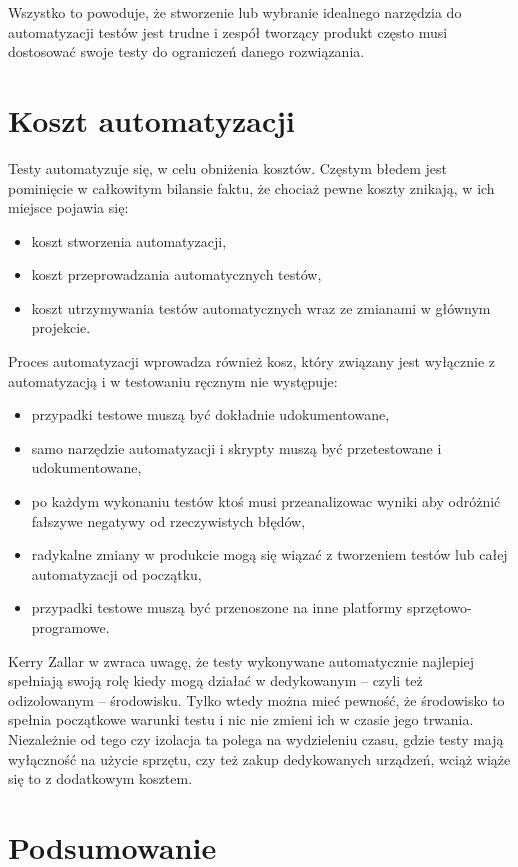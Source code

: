\documentclass[00-praca-magisterska.tex]{subfiles}
\begin{document}
Wszystko to powoduje, że stworzenie lub wybranie idealnego narzędzia do
automatyzacji testów jest trudne i zespół tworzący produkt często musi
dostosować swoje testy do ograniczeń danego rozwiązania.

\section{Koszt automatyzacji}

Testy automatyzuje się, w celu obniżenia kosztów. Częstym błedem jest
pominięcie w całkowitym bilansie faktu, że chociaż pewne koszty znikają, w ich
miejsce pojawia się:
\begin{itemize}
\item koszt stworzenia automatyzacji,
\item koszt przeprowadzania automatycznych testów,
\item koszt utrzymywania testów automatycznych wraz ze zmianami w głównym
projekcie.
\end{itemize}

Proces automatyzacji wprowadza również kosz, który związany jest wyłącznie z
automatyzacją i w testowaniu ręcznym nie występuje:
\begin{itemize}
\item przypadki testowe muszą być dokładnie udokumentowane,
\item samo narzędzie automatyzacji i skrypty muszą być przetestowane i udokumentowane,
\item po każdym wykonaniu testów ktoś musi przeanalizowac wyniki aby odróżnić
fałszywe negatywy od rzeczywistych błędów,
\item radykalne zmiany w produkcie mogą się wiązać z tworzeniem testów lub całej automatyzacji od początku,
\item przypadki testowe muszą być przenoszone na inne platformy sprzętowo-programowe.
\end{itemize}

Kerry Zallar w \cite{practical-automated} zwraca uwagę, że testy wykonywane
automatycznie najlepiej spełniają swoją rolę kiedy mogą działać w dedykowanym
-- czyli też odizolowanym -- środowisku. Tylko wtedy można mieć pewność, że
środowisko to spełnia początkowe warunki testu i nic nie zmieni ich w czasie
jego trwania. Niezależnie od tego czy izolacja ta polega na wydzieleniu czasu,
gdzie testy mają wyłączność na użycie sprzętu, czy też zakup dedykowanych
urządzeń, wciąż wiąże się to z dodatkowym kosztem.

\section{Podsumowanie}
\end{document}
